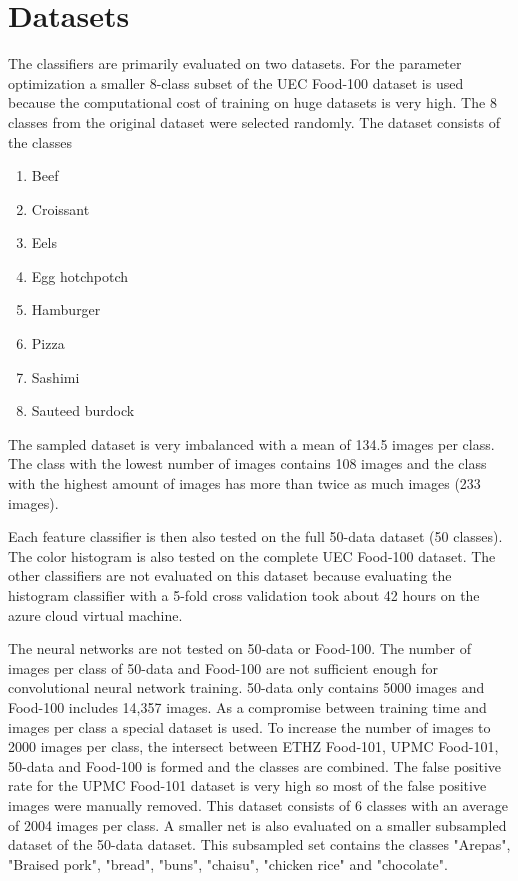 \section{Datasets}
The classifiers are primarily evaluated on two datasets. For the parameter optimization a smaller 8-class subset of the UEC Food-100 dataset is used because the computational cost of training on huge datasets is very high. The 8 classes from the original dataset were selected randomly. The dataset consists of the classes

\begin{enumerate}
	\item Beef
	\item Croissant
	\item Eels
	\item Egg hotchpotch
	\item Hamburger
	\item Pizza
	\item Sashimi
	\item Sauteed burdock
\end{enumerate}
The sampled dataset is very imbalanced with a mean of 134.5 images per class. The class with the lowest number of images contains 108 images and the class with the highest amount of images has more than twice as much images {(233 images)}.

Each feature classifier is then also tested on the full 50-data dataset {(50 classes)}. The color histogram is also tested on the complete UEC Food-100 dataset. The other classifiers are not evaluated on this dataset because evaluating the histogram classifier with a 5-fold cross validation took about 42 hours on the azure cloud virtual machine.

The neural networks are not tested on 50-data or Food-100. The number of images per class of 50-data and Food-100 are not sufficient enough for convolutional neural network training. 50-data only contains 5000 images and Food-100 includes 14,357 images. As a compromise between training time and images per class a special dataset is used. To increase the number of images to 2000 images per class, the intersect between ETHZ Food-101, UPMC Food-101, 50-data and Food-100 is formed and the classes are combined. The false positive rate for the UPMC Food-101 dataset is very high so most of the false positive images were manually removed. This dataset consists of 6 classes with an average of 2004 images per class. A smaller net is also evaluated on a smaller subsampled dataset of the 50-data dataset. This subsampled set contains the classes "Arepas", "Braised pork", "bread", "buns", "chaisu", "chicken rice" and "chocolate".

